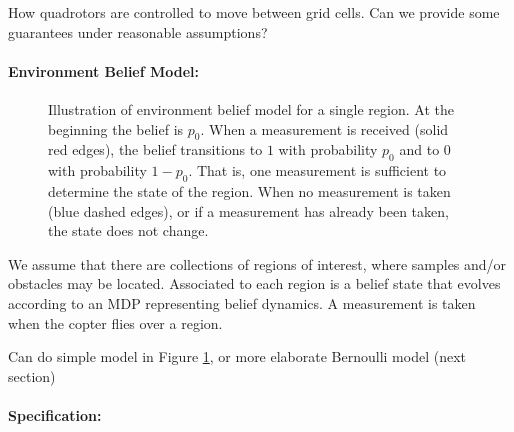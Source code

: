 \documentclass[conference]{IEEEtran}
\newcommand{\red}[1]{{\color{red} #1 }}
\begin{document}
How quadrotors are controlled to move between grid cells. \red{Can we provide some guarantees under reasonable assumptions?}

\paragraph{Environment Belief Model:}

\begin{figure}
  \begin{center}
  \end{center}
  \caption{Illustration of environment belief model for a single region. At the beginning the belief is $p_0$. When a measurement is received (solid red edges), the belief transitions to $1$ with probability $p_0$ and to $0$ with probability $1-p_0$. That is, one measurement is sufficient to determine the state of the region. When no measurement is taken (blue dashed edges), or if a measurement has already been taken, the state does not change.}
  \label{fig:envmdp}
\end{figure}

We assume that there are collections of regions of interest, where samples and/or obstacles may be located. Associated to each region is a belief state that evolves according to an MDP representing belief dynamics. A measurement is taken when the copter flies over a region.

\red{Can do simple model in Figure \ref{fig:envmdp}, or more elaborate Bernoulli model (next section)}


\paragraph{Specification:}
\end{document}
